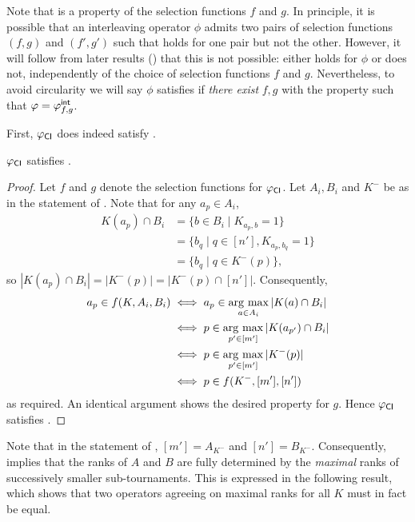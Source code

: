 Note that \smi{} is a property of the selection functions $f$ and $g$.
In principle, it is possible that an interleaving operator $\phi$ admits two
pairs of selection functions $(f, g)$ and $(f', g')$ such that \smi{}
holds for one pair but not the other. However, it will follow from later
results () that this is not possible:
\smi{} either holds for $\phi$ or does not, independently of the choice
of selection functions $f$ and $g$. Nevertheless, to avoid circularity we will
say $\phi$ satisfies \smi{} if \emph{there exist} $f, g$ with the
\smi{} property such that $\varphi = {\varphi_{f, g}^\mathsf{int}}$.

First, ${\varphi_{\mathsf{CI}}}$ does indeed satisfy \smi{}.

\begin{proposition}
    \label{tourn_result_phicardint_smi}
    ${\varphi_{\mathsf{CI}}}$ satisfies \smi{}.
\end{proposition}

\begin{proof}
    Let $f$ and $g$ denote the selection functions for ${\varphi_{\mathsf{CI}}}$. Let $A_i,
    B_i$ and $K^-$ be as in the statement of \smi{}. Note that for any
    $a_p \in A_i$,
    \begin{align*}
        K(a_p) \cap B_i
        &= \{b \in B_i \mid K_{a_p,b} = 1\} \\
        &= \{b_q \mid q \in [n'], K_{a_p, b_q} = 1\} \\
        &= \{b_q \mid q \in K^-(p)\},
    \end{align*}
    so $|K(a_p) \cap B_i| = |K^-(p)| = |K^-(p) \cap [n']|$. Consequently,
    \begin{align*}
        a_p \in f(K, A_i, B_i)
        &\iff a_p \in \operatorname*{arg\ max}_{a \in A_i}{|K(a) \cap B_i|} \\
        &\iff p \in \operatorname*{arg\ max}_{p' \in [m']}{|K(a_{p'}) \cap B_i|} \\
        &\iff p \in \operatorname*{arg\ max}_{p' \in [m']}{|K^-(p)|} \\
        &\iff p \in f(K^-, [m'], [n'])
    \end{align*}
    as required. An identical argument shows the desired property for $g$.
    Hence ${\varphi_{\mathsf{CI}}}$ satisfies \smi{}.
\end{proof}

Note that in the statement of \smi{}, $[m'] = A_{K^-}$ and $[n'] =
B_{K^-}$. Consequently, \smi{} implies that the ranks of $A$ and $B$
are fully determined by the \emph{maximal} ranks of successively smaller
sub-tournaments. This is expressed in the following result, which shows that
two \smi{} operators agreeing on maximal ranks for all $K$ must in fact
be equal.

